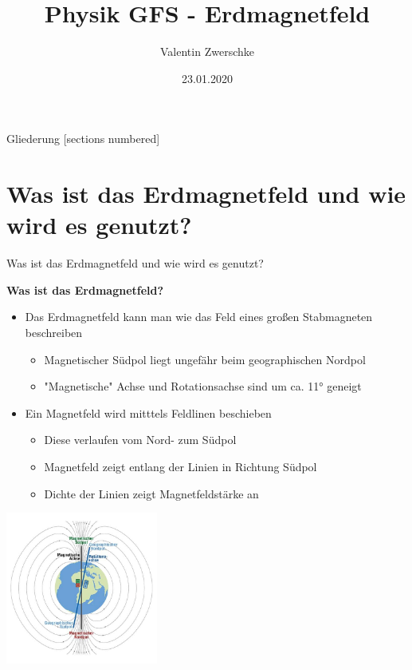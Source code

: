 \documentclass[10pt]{beamer}
\title{Physik GFS - Erdmagnetfeld}
\date{23.01.2020}
\author{Valentin Zwerschke}
\institute{Königin Olga Stift - Stuttgart}
\begin{document}
\maketitle

\begin{frame}{Gliederung}
  [sections numbered]
  \tableofcontents[hideallsubsections]
\end{frame}
\section{Was ist das Erdmagnetfeld und wie wird es genutzt?}
\begin{frame}{Was ist das Erdmagnetfeld und wie wird es genutzt?}
        \begin{minipage}[c]{7cm}
            \textbf{Was ist das Erdmagnetfeld?}\pause
            \begin{itemize}
                \item Das Erdmagnetfeld kann man wie das Feld eines großen Stabmagneten beschreiben \pause
                \begin{itemize}
                    \item Magnetischer Südpol liegt ungefähr beim geographischen Nordpol\pause
                    \item "Magnetische" Achse und Rotationsachse sind um ca. 11° geneigt\pause
                \end{itemize}
                \item Ein Magnetfeld wird mitttels Feldlinen beschieben\pause
                
                \begin{itemize}
                \item Diese verlaufen vom Nord- zum Südpol\pause
                    \item Magnetfeld zeigt entlang der Linien in Richtung Südpol \pause
                    \item Dichte der Linien zeigt Magnetfeldstärke an\pause
                \end{itemize}
            \end{itemize}
    \end{minipage}
    \begin{minipage}[c]{3cm}
    \hspace{1cm}
        \includegraphics[height = 5cm]{Erdmagnetfeld-und-Rotation.jpg}
    \end{minipage}
\end{frame}
\end{document}
